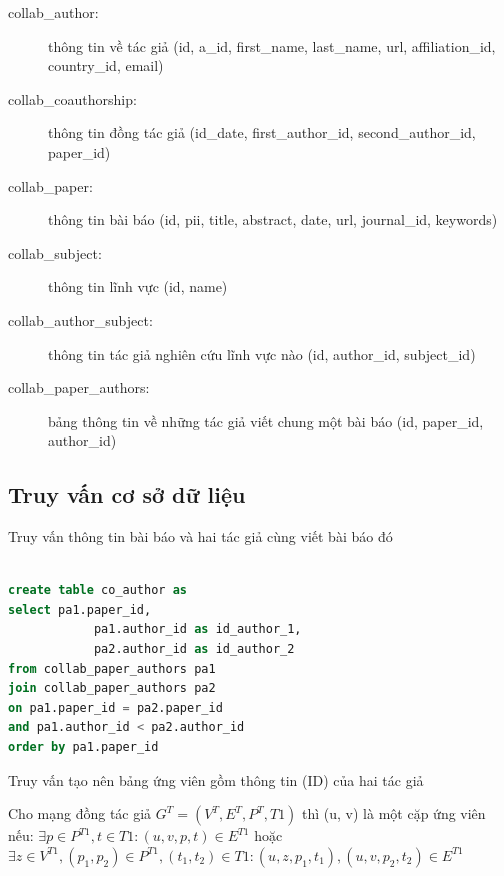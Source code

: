 \documentclass{article}
\begin{document}
\begin{description}
    \item[collab\_author:] thông tin về tác giả (id, a\_id, first\_name, last\_name, url, affiliation\_id, country\_id, email)
    \item[collab\_coauthorship:] thông tin đồng tác giả (id\_date, first\_author\_id, second\_author\_id, paper\_id) 
    \item[collab\_paper:] thông tin bài báo (id, pii, title, abstract, date, url, journal\_id, keywords)
    \item[collab\_subject:] thông tin lĩnh vực (id, name)
    \item[collab\_author\_subject:] thông tin tác giả nghiên cứu lĩnh vực nào (id, author\_id, subject\_id)
    \item[collab\_paper\_authors:] bảng thông tin về những tác giả viết chung một bài báo (id, paper\_id, author\_id)
\end{description}

\subsection{Truy vấn cơ sở dữ liệu}

\indent Truy vấn thông tin bài báo và hai tác giả cùng viết bài báo đó

\begin{lstlisting}[language=SQL, caption=Đồng tác giả]

create table co_author as
select pa1.paper_id,
			pa1.author_id as id_author_1,
			pa2.author_id as id_author_2
from collab_paper_authors pa1
join collab_paper_authors pa2
on pa1.paper_id = pa2.paper_id
and pa1.author_id < pa2.author_id
order by pa1.paper_id

\end{lstlisting}

\indent Truy vấn tạo nên bảng ứng viên gồm thông tin (ID) của hai tác giả

Cho mạng đồng tác giả $G^T=(V^T, E^T, P^T, T1)$ thì (u, v) là một cặp ứng viên nếu:
$\exists p \in P^{T1}, t \in T1: (u, v, p, t) \in E^{T1}$ hoặc $\exists z \in V^{T1}, (p_1, p_2) \in P^{T1}, (t_1, t_2) \in T1: (u, z, p_1, t_1), (u, v, p_2, t_2) \in E^{T1}$
\end{document}
